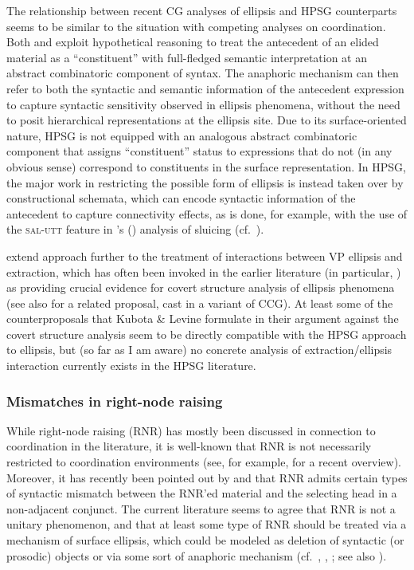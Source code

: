 \documentclass[output=paper
                ,modfonts
 	        ,biblatex
                ,babelshorthands
                ,newtxmath
                ,draftmode
                ,colorlinks, citecolor=brown
]{langscibook}
\begin{document}
The relationship between recent CG analyses of ellipsis and
HPSG counterparts seems to be similar to the situation with competing
analyses on coordination. Both \citet{barker-sluicing} and
\citet{kubota-levine-pseudo} exploit hypothetical reasoning to treat the
antecedent of an elided material as a ``constituent'' with full-fledged
semantic interpretation at an abstract combinatoric component of
syntax. The anaphoric mechanism can then refer to both the syntactic
and semantic information of the antecedent expression to capture
syntactic sensitivity observed in ellipsis phenomena, without the need
to posit hierarchical representations at the ellipsis site. Due to its
surface-oriented nature, HPSG is not equipped with an analogous
abstract combinatoric component that assigns ``constituent'' status to
expressions that do not (in any obvious sense) correspond to
constituents in the surface representation. In HPSG, the major work in
restricting the possible form of ellipsis is instead
taken over by constructional schemata, which can encode
syntactic information of the antecedent to capture connectivity
effects, as is done, for example, with the use of the 
\textsc{sal-utt} feature in \citeauthor{GSag2000a-u}'s 
(\citeyear[Chapter 8]{GSag2000a-u}) analysis of sluicing
(cf.~).

\citet[Chapter 8]{KubotaLevineBook} extend 
 approach further to the treatment of
interactions between  VP ellipsis and extraction, which has often been
invoked in the earlier literature (in particular, \citealt{kennedy2003})
as providing crucial evidence for  covert structure analysis of
ellipsis phenomena (see also \citealt{Jacobson14ellipsis} for a related
proposal, cast in a variant of CCG).
At least some of the counterproposals that Kubota \& Levine formulate
in their argument against the covert structure analysis seem to be
directly compatible with the HPSG approach to ellipsis,  but (so far
as I am aware)  no concrete analysis of extraction/ellipsis
interaction currently exists in the HPSG literature.




\subsubsection{Mismatches in right-node raising}

While right-node raising (RNR) has mostly been discussed in connection to coordination in
the literature, it is well-known that RNR is not necessarily
restricted to coordination environments (see, for example, \citealt{wilder-ellipsis-handbook}
for a recent overview). Moreover, it
has recently been pointed out by \citet{ACS2016a-u} and \citet{SAHM2019a-u} that RNR 
admits certain types of syntactic mismatch between the RNR'ed material
and the selecting head in a non-adjacent conjunct.
The current literature seems to agree that RNR is not a unitary
phenomenon, and that at least some type of RNR should be treated via a
mechanism of surface ellipsis, which could be modeled as deletion of
syntactic (or prosodic) objects or via some sort of anaphoric
mechanism (cf.\ ,
\citealt{Chaves2014a-u}, 
\citealt{SAHM2019a-u}; see also \citealt[footnote 15]{kubota-levine-pseudo}).
\end{document}
